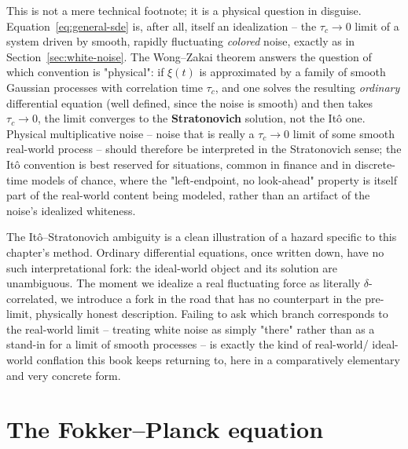 This is not a mere technical footnote; it is a physical question in
disguise. Equation~\eqref{eq:general-sde} is, after all, itself an
idealization -- the $\tau_c\to 0$ limit of a system driven by smooth,
rapidly fluctuating \emph{colored} noise, exactly as in
Section~\ref{sec:white-noise}. The Wong--Zakai theorem answers the
question of which convention is "physical": if $\xi(t)$ is approximated by
a family of smooth Gaussian processes with correlation time $\tau_c$, and
one solves the resulting \emph{ordinary} differential equation (well
defined, since the noise is smooth) and then takes $\tau_c\to 0$, the
limit converges to the \textbf{Stratonovich} solution, not the It\^o one.
Physical multiplicative noise -- noise that is really a $\tau_c\to0$ limit
of some smooth real-world process -- should therefore be interpreted in
the Stratonovich sense; the It\^o convention is best reserved for
situations, common in finance and in discrete-time models of chance, where
the "left-endpoint, no look-ahead" property is itself part of the
real-world content being modeled, rather than an artifact of the noise's
idealized whiteness.

\begin{remark}
The It\^o--Stratonovich ambiguity is a clean illustration of a hazard
specific to this chapter's method. Ordinary differential equations, once
written down, have no such interpretational fork: the ideal-world object
and its solution are unambiguous. The moment we idealize a real
fluctuating force as literally $\delta$-correlated, we introduce a fork in
the road that has no counterpart in the pre-limit, physically honest
description. Failing to ask which branch corresponds to the real-world
limit -- treating white noise as simply "there" rather than as a stand-in
for a limit of smooth processes -- is exactly the kind of real-world/
ideal-world conflation this book keeps returning to, here in a
comparatively elementary and very concrete form.
\end{remark}

\section{The Fokker--Planck equation}
\label{sec:fpe}

